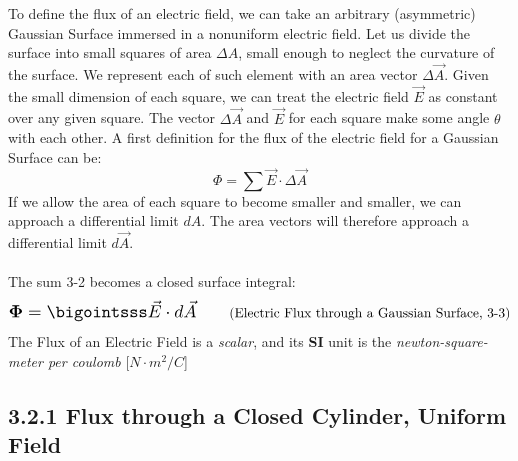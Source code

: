 \documentclass[12pt, a4paper]{article}
\begin{document}
		To define the flux of an electric field, we can take an arbitrary (asymmetric) Gaussian Surface immersed in a nonuniform electric field. Let us divide the surface into small squares of area $\Delta A$, small enough to neglect the curvature of the surface. We represent each of such element with an area vector $\Delta\vec{A}$.
		Given the small dimension of each square, we can treat the electric field $\vec{E}$ as constant over any given square. The vector $\Delta\vec{A}$ and $\vec{E}$ for each square make some angle $\theta$ with each other. A first definition for the flux of the electric field for a Gaussian Surface can be:
		\begin{equation*}
			\Phi = \sum \vec{E} \cdot \Delta\vec{A}
			\tag{3-2}
		\end{equation*}
		If we allow the area of each square to become smaller and smaller, we can approach a differential limit $dA$. The area vectors will therefore approach a differential limit $d\vec{A}$. \\ \\The sum 3-2 becomes a closed surface integral:
		\begin{equation*}
			\scalebox{1.3}{$ \mathbf{\Phi} = \bigointsss \vec{E} \cdot d\vec{A}$ }
			\tag{Electric Flux through a Gaussian Surface, 3-3}
		\end{equation*}
		The Flux of an Electric Field is a \textit{scalar}, and its \textbf{SI} unit is the \textit{newton-square-meter per coulomb} [$N \cdot m^2/C$] 
		
		\newpage
		\subsection*{3.2.1 Flux through a Closed Cylinder, Uniform Field}
		
\end{document}

